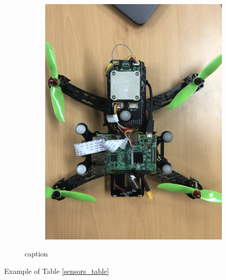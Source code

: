 \begin{figure}
\begin{subfigure}[b]{0.49\textwidth}
		\includegraphics[width=\textwidth,keepaspectratio]{Figures/drone_setup.jpg}
	\end{subfigure}
	\caption{caption}
	\label{drone_fig_2}
\end{figure}

Example of Table \ref{sensors_table} \cite{kys}

